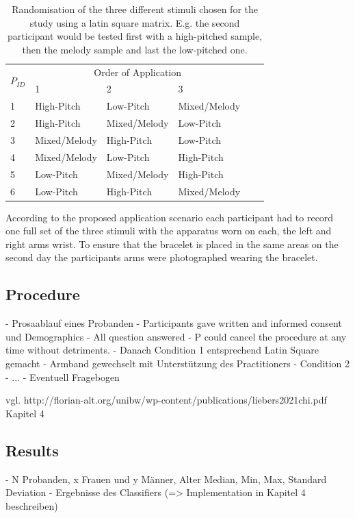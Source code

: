 \begin{table}[H]
	\centering
	\label{tbl:lat_sqr}
	\caption{Randomisation of the three different stimuli chosen for the study using a latin square matrix. E.g. the second participant would be tested first with a high-pitched sample, then the melody sample and last the low-pitched one.}
	\begin{tabular}{p{1cm}llllp{1cm}}
		\toprule%
		\multirow{2}{*}{$P_{ID}$} & \multicolumn{3}{c}{Order of Application}\\%
		{} & 1 & 2 & 3 \\%
		\midrule%
		1 & High-Pitch & Low-Pitch & Mixed/Melody \\%
		2 & High-Pitch & Mixed/Melody & Low-Pitch \\%
		3 & Mixed/Melody & High-Pitch & Low-Pitch \\%
		4 & Mixed/Melody & Low-Pitch & High-Pitch \\%
		5 & Low-Pitch & Mixed/Melody & High-Pitch \\%
		6 & Low-Pitch & High-Pitch & Mixed/Melody \\%
		\bottomrule%
	\end{tabular}
\end{table}


According to the proposed application scenario each participant had to record one full set of the three stimuli with the apparatus worn on each, the left and right arms wrist.
To ensure that the bracelet is placed in the same areas on the second day the participants arms were photographed wearing the bracelet.

\subsection{Procedure}
- Prosaablauf eines Probanden
- Participants gave written and informed consent und Demographics
- All question answered
- P could cancel the procedure at any time without detriments.
- Danach Condition 1 entsprechend Latin Square gemacht
- Armband gewechselt mit Unterstützung des Practitioners
- Condition 2
- ...
- Eventuell Fragebogen

vgl. http://florian-alt.org/unibw/wp-content/publications/liebers2021chi.pdf Kapitel 4

\subsection{Results}
- N Probanden, x Frauen und y Männer, Alter Median, Min, Max, Standard Deviation
- Ergebnisse des Classifiers (=> Implementation in Kapitel 4 beschreiben)

